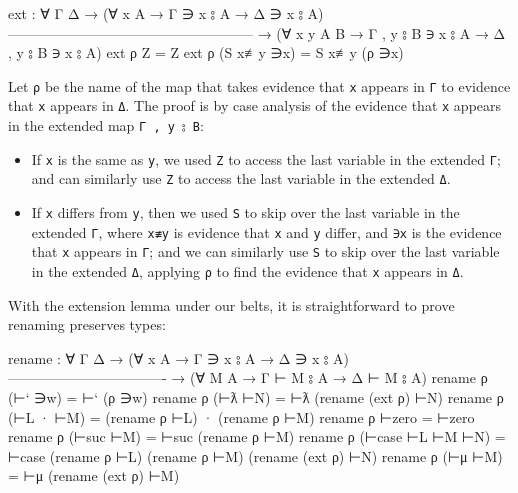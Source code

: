 \begin{fence}
\begin{code}
ext : ∀ {Γ Δ}
  → (∀ {x A}     →         Γ ∋ x ⦂ A →         Δ ∋ x ⦂ A)
    -----------------------------------------------------
  → (∀ {x y A B} → Γ , y ⦂ B ∋ x ⦂ A → Δ , y ⦂ B ∋ x ⦂ A)
ext ρ Z           =  Z
ext ρ (S x≢y ∋x)  =  S x≢y (ρ ∋x)
\end{code}
\end{fence}

Let \texttt{ρ} be the name of the map that takes evidence that
\texttt{x} appears in \texttt{Γ} to evidence that \texttt{x} appears in
\texttt{Δ}. The proof is by case analysis of the evidence that
\texttt{x} appears in the extended map \texttt{Γ\ ,\ y\ ⦂\ B}:

\begin{itemize}
\item
  If \texttt{x} is the same as \texttt{y}, we used \texttt{Z} to access
  the last variable in the extended \texttt{Γ}; and can similarly use
  \texttt{Z} to access the last variable in the extended \texttt{Δ}.
\item
  If \texttt{x} differs from \texttt{y}, then we used \texttt{S} to skip
  over the last variable in the extended \texttt{Γ}, where \texttt{x≢y}
  is evidence that \texttt{x} and \texttt{y} differ, and \texttt{∋x} is
  the evidence that \texttt{x} appears in \texttt{Γ}; and we can
  similarly use \texttt{S} to skip over the last variable in the
  extended \texttt{Δ}, applying \texttt{ρ} to find the evidence that
  \texttt{x} appears in \texttt{Δ}.
\end{itemize}

With the extension lemma under our belts, it is straightforward to prove
renaming preserves types:

\begin{fence}
\begin{code}
rename : ∀ {Γ Δ}
  → (∀ {x A} → Γ ∋ x ⦂ A → Δ ∋ x ⦂ A)
    ----------------------------------
  → (∀ {M A} → Γ ⊢ M ⦂ A → Δ ⊢ M ⦂ A)
rename ρ (⊢` ∋w)           =  ⊢` (ρ ∋w)
rename ρ (⊢ƛ ⊢N)           =  ⊢ƛ (rename (ext ρ) ⊢N)
rename ρ (⊢L · ⊢M)         =  (rename ρ ⊢L) · (rename ρ ⊢M)
rename ρ ⊢zero             =  ⊢zero
rename ρ (⊢suc ⊢M)         =  ⊢suc (rename ρ ⊢M)
rename ρ (⊢case ⊢L ⊢M ⊢N)  =  ⊢case (rename ρ ⊢L) (rename ρ ⊢M) (rename (ext ρ) ⊢N)
rename ρ (⊢μ ⊢M)           =  ⊢μ (rename (ext ρ) ⊢M)
\end{code}
\end{fence}

